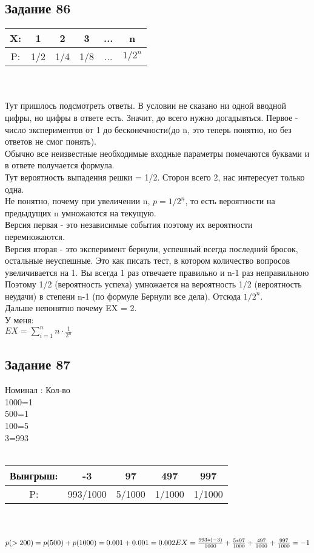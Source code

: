 \documentclass[12pt]{article}
\begin{document}
\subsection{Задание 86}
\begin{tabular}{|c|c|c|c|c|c|}
\hline
X: & 1 & 2 & 3 & ... & n \\
\hline
P: & 1/2 & 1/4 & 1/8 & ... &         $1/2^n        $ \\
\hline
\end{tabular}
\\
\\
Тут пришлось подсмотреть ответы. В условии не сказано ни одной вводной цифры, но цифры в ответе есть. Значит, до всего нужно догадывться. Первое - число экспериментов от 1 до бесконечности(до n, это теперь понятно, но без ответов не смог понять).\\
Обычно все неизвестные необходимые входные параметры помечаются буквами и в ответе получается формула.\\
Тут вероятность выпадения решки = 1/2. Сторон всего 2, нас интересует только одна.\\
Не понятно, почему при увеличении n, $p = 1/2^n$, то есть вероятности на предыдущих n умножаются на текущую.\\
Версия первая - это независимые события поэтому их вероятности перемножаются.\\
Версия вторая  - это эксперимент бернули, успешный всегда последний бросок, остальные неуспешные. Это как писать тест, в котором количество вопросов увеличивается на 1. Вы всегда 1 раз отвечаете правильно и n-1 раз неправильною\\
Поэтому 1/2 (вероятность успеха) умножается  на вероятность 1/2 (вероятность неудачи) в степени n-1 (по формуле Бернули все дела). Отсюда $1/2^n$.\\
Дальше непонятно почему EX = 2.\\
У меня:\\
$
EX = \sum_{i=1}^n n\cdot \frac{1}{2^n}
$
\newpage
\subsection{Задание 87}
Номинал : Кол-во\\
1000=1\\
500=1\\
100=5\\
3=993\\
\\
\begin{tabular}{|c|c|c|c|c|}
\hline
Выигрыш: & -3 & 97 & 497 & 997  \\
\hline
P: & 993/1000 & 5/1000 & 1/1000 & 1/1000 \\
\hline
\end{tabular}
\\
\\
$
p(>200)= p(500)+p(1000)=0.001+0.001=0.002\\
EX = \frac{993*(-3)}{1000}+\frac{5*97}{1000}+\frac{497}{1000}+\frac{997}{1000}=-1
$
\newpage
\end{document}
